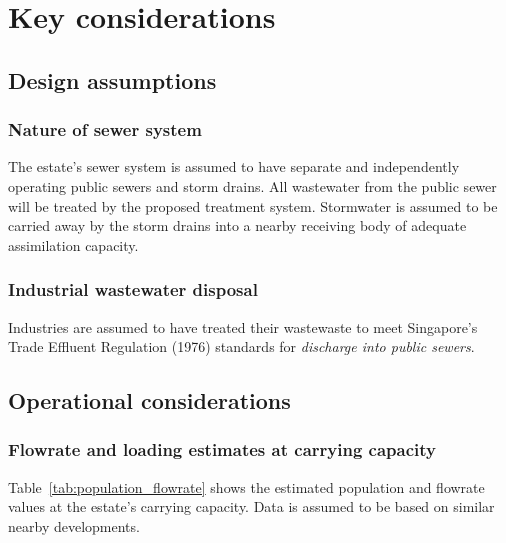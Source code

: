 \documentclass[a4paper,10pt]{article}
\begin{document}
\section{Key considerations}

\subsection{Design assumptions}
\subsubsection{Nature of sewer system}
The estate's sewer system is assumed to have separate and independently operating public sewers and storm drains. 
All wastewater from the public sewer will be treated by the proposed treatment system. 
Stormwater is assumed to be carried away by the storm drains into a nearby receiving body of adequate assimilation capacity.

\subsubsection{Industrial wastewater disposal}
\label{sec:industrial_wastewater_disposal}
Industries are assumed to have treated their wastewaste to meet Singapore's Trade Effluent Regulation (1976) standards for \emph{discharge into public sewers}.


\subsection{Operational considerations}
\subsubsection{Flowrate and loading estimates at carrying capacity}
Table~\ref{tab:population_flowrate} shows the estimated population and flowrate values at the estate's carrying capacity. Data is assumed to be based on similar nearby developments.
\end{document}
